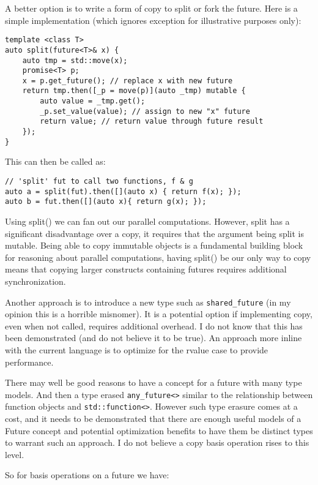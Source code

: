 A better option is to write a form of copy to split or fork the future. Here is a simple implementation (which ignores exception for illustrative purposes only):

\begin{verbatim}
template <class T>
auto split(future<T>& x) {
    auto tmp = std::move(x);
    promise<T> p;
    x = p.get_future(); // replace x with new future
    return tmp.then([_p = move(p)](auto _tmp) mutable {
        auto value = _tmp.get();
        _p.set_value(value); // assign to new "x" future
        return value; // return value through future result
    });
}
\end{verbatim}

This can then be called as:

\begin{verbatim}
// 'split' fut to call two functions, f & g
auto a = split(fut).then([](auto x) { return f(x); });
auto b = fut.then([](auto x){ return g(x); });
\end{verbatim}

Using split() we can fan out our parallel computations. However, split has a significant disadvantage over a copy, it requires that the argument being split is mutable. Being able to copy immutable objects is a fundamental building block for reasoning about parallel computations, having split() be our only way to copy means that copying larger constructs containing futures requires additional synchronization.

Another approach is to introduce a new type such as \texttt{shared_future} (in my opinion this is a horrible misnomer). It is a potential option if implementing copy, even when not called, requires additional overhead. I do not know that this has been demonstrated (and do not believe it to be true). An approach more inline with the current language is to optimize for the rvalue case to provide performance.

There may well be good reasons to have a concept for a future with many type models. And then a type erased  \texttt{any_future<>} similar to the relationship between function objects and \texttt{std::function<>}. However such type erasure comes at a cost, and it needs to be demonstrated that there are enough useful models of a Future concept and potential optimization benefits to have them be distinct types to warrant such an approach. I do not believe a copy basis operation rises to this level.

So for basis operations on a future we have:

